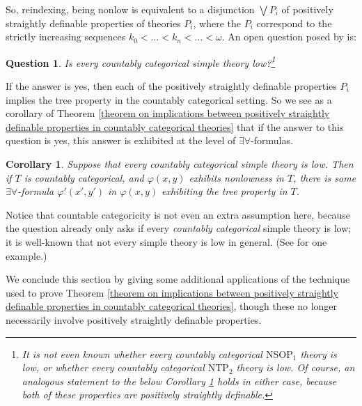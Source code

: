 \documentclass{article}
\newtheorem{question}{Question}
\newtheorem{corollary}{Corollary}
\theoremstyle{definition}
\theoremstyle{definition}
\theoremstyle{definition}
\begin{document}
So, reindexing, being nonlow is equivalent to a disjunction $\bigvee P_{i}$ of positively straightly definable properties of theories $P_{i}$, where the $P_{i}$ correspond to the strictly increasing sequences $k_{0} < \ldots < k_{n} < \ldots < \omega$. An open question posed by \cite{palacin2012omega} is:

\begin{question}
Is every countably categorical simple theory low?\footnote{It is not even known whether every countably categorical $\mathrm{NSOP}_{1}$ theory is low, or whether every countably categorical $\mathrm{NTP}_{2}$ theory is low. Of course, an analogous statement to the below Corollary \ref{ea-tree for countably categorical nonlow} holds in either case, because both of these properties are positively straightly definable. }
\end{question}

If the answer is yes, then each of the positively straightly definable properties $P_{i}$ implies the tree property in the countably categorical setting. So we see as a corollary of Theorem \ref{theorem on implications between positively straightly definable properties in countably categorical theories} that if the answer to this question is yes, this answer is exhibited at the level of $\exists\forall$-formulas.


\begin{corollary}\label{ea-tree for countably categorical nonlow}
Suppose that every countably categorical simple theory is low. Then if $T$ is countably categorical, and $\varphi(x, y)$ exhibits nonlowness in $T$, there is some $\exists\forall$-formula $\varphi'(x', y')$ in $\varphi(x, y)$ exhibiting the tree property in $T$.    
\end{corollary}

Notice that countable categoricity is not even an extra assumption here, because the question already only asks if every \textit{countably categorical} simple theory is low; it is well-known that not every simple theory is low in general. (See \cite{CasanovasKim1998} for one example.)

We conclude this section by giving some additional applications of the technique used to prove Theorem \ref{theorem on implications between positively straightly definable properties in countably categorical theories}, though these no longer necessarily involve positively straightly definable properties.
\end{document}
